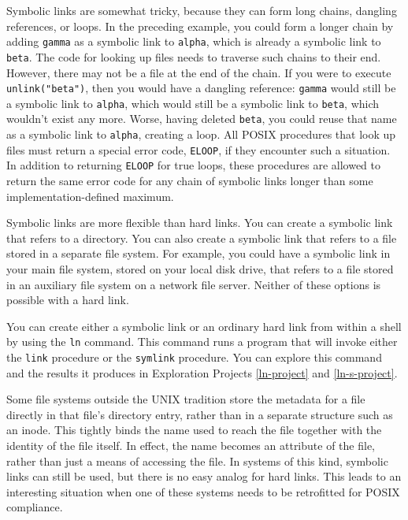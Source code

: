 Symbolic links are somewhat tricky, because they can form long chains,
dangling references, or loops.  In the preceding example, you could form a
longer chain by adding \verb|gamma| as a symbolic link to \verb|alpha|,
which is already a symbolic link to \verb|beta|.  The code for looking
up files needs to traverse such chains to their end.  However, there
may not be a file at the end of the chain.  If you were to execute
\verb|unlink("beta")|, then you would have a dangling reference:
\verb|gamma| would still be a symbolic link to \verb|alpha|, which would
still be a symbolic link to \verb|beta|, which wouldn't exist any more.
Worse, having deleted \verb|beta|, you could reuse that name as a
symbolic link to \verb|alpha|, creating a loop. All POSIX
procedures that look up files must return a special error code,
\verb|ELOOP|, if they encounter such a situation.  In addition to
returning \verb|ELOOP| for true loops, these procedures
are allowed to return the same error code for any chain of symbolic
links longer than some implementation-defined maximum.

Symbolic links are more flexible than hard links.  You can create a symbolic link that refers to a directory.  You can also create a symbolic link that refers to a file stored in a separate file system.  For example, you could have a symbolic link in your main file system, stored on your local disk drive, that refers to a file stored in an auxiliary file system on a network file server.  Neither of these options is possible with a hard link.

You can create either a symbolic link or an ordinary hard link from
within a shell by using the \verb|ln| command.  This command runs a
program that will invoke either the \verb|link| procedure or the
\verb|symlink| procedure.  You can explore this command and the
results it produces in Exploration Projects \ref{ln-project} and
\ref{ln-s-project}.

Some file systems outside the UNIX tradition store the metadata for a
file directly in that file's directory entry, rather than in a
separate structure such as an inode.  This tightly binds the name used
to reach the file together with the identity of the file itself.  In
effect, the name becomes an attribute of the file, rather than just a
means of accessing the file.  In
systems of this kind, symbolic links can still be used, but there is
no easy analog for hard links.  This leads to an interesting situation
when one of these systems needs to be retrofitted for POSIX
compliance.

